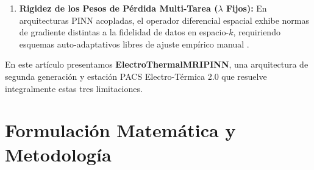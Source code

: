 \documentclass[10pt,journal,compsoc]{IEEEtran}
\begin{document}
\begin{enumerate}
    \item \textbf{Rigidez de los Pesos de Pérdida Multi-Tarea ($\lambda$ Fijos):} En arquitecturas PINN acopladas, el operador diferencial espacial exhibe normas de gradiente distintas a la fidelidad de datos en espacio-$k$, requiriendo esquemas auto-adaptativos libres de ajuste empírico manual \cite{wang2021understanding}.
\end{enumerate}

En este artículo presentamos \textbf{ElectroThermalMRIPINN}, una arquitectura de segunda generación y estación PACS Electro-Térmica 2.0 que resuelve integralmente estas tres limitaciones.

\section{Formulación Matemática y Metodología}
\end{document}
